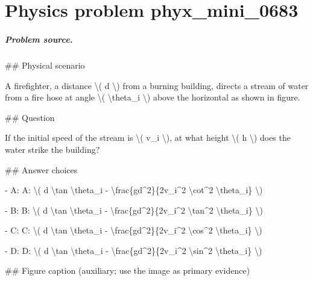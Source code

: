 
\chapter{Physics problem phyx\_mini\_0683}
\label{ch:PhyXMiniProblems_problem_phyx_mini_0683}

\paragraph{Problem source.}
\#\# Physical scenario

A firefighter, a distance \textbackslash{}( d \textbackslash{}) from a burning building, directs a stream of water from a fire hose at angle \textbackslash{}( \textbackslash{}theta\_i \textbackslash{}) above the horizontal as shown in figure.

\#\# Question

If the initial speed of the stream is \textbackslash{}( v\_i \textbackslash{}), at what height \textbackslash{}( h \textbackslash{}) does the water strike the building?

\#\# Answer choices

- A: A: \textbackslash{}( d \textbackslash{}tan \textbackslash{}theta\_i - \textbackslash{}frac\{gd\textasciicircum{}2\}\{2v\_i\textasciicircum{}2 \textbackslash{}cot\textasciicircum{}2 \textbackslash{}theta\_i\} \textbackslash{})

- B: B: \textbackslash{}( d \textbackslash{}tan \textbackslash{}theta\_i - \textbackslash{}frac\{gd\textasciicircum{}2\}\{2v\_i\textasciicircum{}2 \textbackslash{}tan\textasciicircum{}2 \textbackslash{}theta\_i\} \textbackslash{})

- C: C: \textbackslash{}( d \textbackslash{}tan \textbackslash{}theta\_i - \textbackslash{}frac\{gd\textasciicircum{}2\}\{2v\_i\textasciicircum{}2 \textbackslash{}cos\textasciicircum{}2 \textbackslash{}theta\_i\} \textbackslash{})

- D: D: \textbackslash{}( d \textbackslash{}tan \textbackslash{}theta\_i - \textbackslash{}frac\{gd\textasciicircum{}2\}\{2v\_i\textasciicircum{}2 \textbackslash{}sin\textasciicircum{}2 \textbackslash{}theta\_i\} \textbackslash{})

\#\# Figure caption (auxiliary; use the image as primary evidence)

